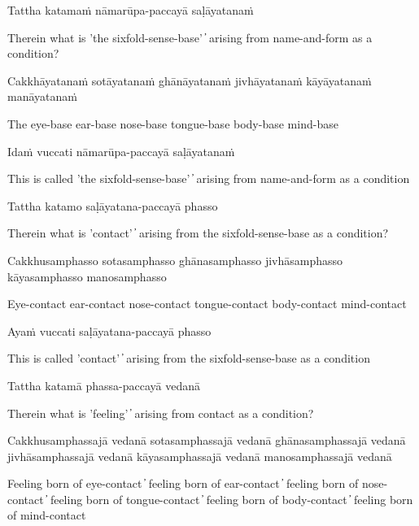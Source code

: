 Tattha katamaṁ nāmarūpa-paccayā saḷāyatanaṁ

\begin{cprenglish}
  Therein what is 'the sixfold-sense-base'  ̓  arising from name-and-form as a condition?
\end{cprenglish}

Cakkhāyatanaṁ sotāyatanaṁ ghānāyatanaṁ jivhāyatanaṁ kāyāyatanaṁ manāyatanaṁ

\begin{cprenglish}
  The eye-base ear-base nose-base tongue-base body-base mind-base
\end{cprenglish}

Idaṁ vuccati nāmarūpa-paccayā saḷāyatanaṁ

\begin{cprenglish}
  This is called 'the sixfold-sense-base'  ̓  arising from name-and-form as a condition
\end{cprenglish}

Tattha katamo saḷāyatana-paccayā phasso

\begin{cprenglish}
  Therein what is 'contact'  ̓  arising from the sixfold-sense-base as a condition?
\end{cprenglish}

Cakkhusamphasso sotasamphasso ghānasamphasso jivhāsamphasso kāyasamphasso manosamphasso

\begin{cprenglish}
  Eye-contact ear-contact nose-contact tongue-contact body-contact mind-contact
\end{cprenglish}

Ayaṁ vuccati saḷāyatana-paccayā phasso

\begin{cprenglish}
  This is called 'contact'  ̓  arising from the sixfold-sense-base as a condition
\end{cprenglish}

Tattha katamā phassa-paccayā vedanā

\begin{cprenglish}
  Therein what is 'feeling'  ̓  arising from contact as a condition?
\end{cprenglish}

Cakkhusamphassajā vedanā sotasamphassajā vedanā ghānasamphassajā vedanā jivhāsamphassajā vedanā kāyasamphassajā vedanā manosamphassajā vedanā

\begin{cprenglish}
  Feeling born of eye-contact  ̓  feeling born of ear-contact  ̓
  feeling born of nose-contact  ̓  feeling born of tongue-contact  ̓  feeling born of body-contact  ̓  feeling born of mind-contact
\end{cprenglish}

